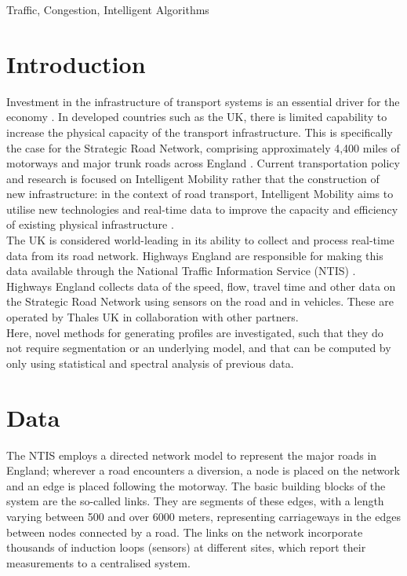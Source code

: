 \documentclass[conference]{IEEEtran}
\begin{document}
\begin{IEEEkeywords}
Traffic, Congestion, Intelligent Algorithms
\end{IEEEkeywords}

\section{Introduction}
Investment in the infrastructure of transport systems is an essential driver for the economy \cite{government}. 
In developed countries such as the UK, there is limited capability to increase the physical capacity of the transport infrastructure. 
This is specifically the case for the Strategic Road Network, comprising approximately 4,400 miles of motorways and major trunk roads across England \cite{Strategic}. 
Current transportation policy and research is focused on Intelligent Mobility rather that the construction of new infrastructure: in the context of road transport, Intelligent Mobility aims to utilise new technologies and real-time data to improve the capacity and efficiency of existing physical infrastructure \cite{needs}.\\

The UK is considered world-leading in its ability to collect and process real-time data from its road network. 
Highways England are responsible for making this data available through the National Traffic Information Service (NTIS) \cite{NTIS}. 
Highways England collects data of the speed, flow, travel time and other data on the Strategic Road Network using sensors on the road and in vehicles. 
These are operated by Thales UK in collaboration with other partners.\\

Here, novel methods for generating profiles are investigated, such that they do not require segmentation or an underlying model, and that can be computed by only using statistical and spectral analysis of previous data.

\section{Data}
The NTIS employs a directed network model to represent the major roads in England; wherever a road encounters a diversion, a node is placed on the network and an edge is placed following the motorway.
The basic building blocks of the system are the so-called links. 
They are segments of these edges, with a length varying between 500 and over 6000 meters, representing carriageways in the edges between nodes connected by a road. 
The links on the network incorporate thousands of induction loops (sensors) at different sites, which report their measurements to a centralised system.\\
\end{document}
